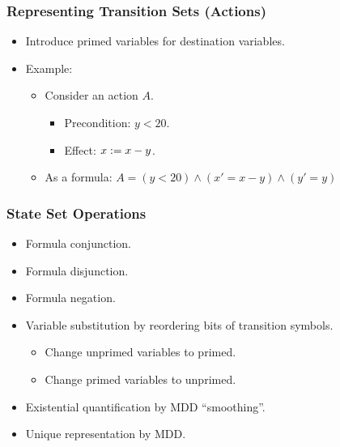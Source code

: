 \documentclass[handout]{beamer}
\begin{document}
\begin{frame}
\frametitle{Representing Transition Sets (Actions)}
\begin{itemize}
\item Introduce primed variables for destination variables.
\item Example:
 \begin{itemize}
 \item Consider an action $A$.
  \begin{itemize}
  \item[] Precondition: $y < 20$.
  \item[] Effect: $x := x - y$.
  \end{itemize}
 \item As a formula: $A = (y < 20) \wedge (x' = x - y) \wedge (y' = y)$
 \end{itemize}
\end{itemize}
\end{frame}


\begin{frame}
\frametitle{State Set Operations}
\begin{itemize}
\item Formula conjunction.
\item Formula disjunction.
\item Formula negation.
\item Variable substitution by reordering bits of transition symbols.
 \begin{itemize}
 \item Change unprimed variables to primed.
 \item Change primed variables to unprimed.
 \end{itemize}
\item Existential quantification by MDD ``smoothing''.
\item Unique representation by MDD.
\end{itemize}
\end{frame}
\end{document}
